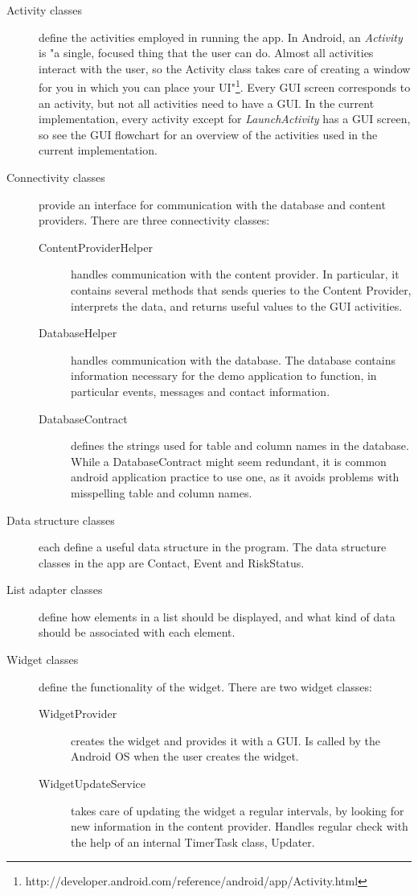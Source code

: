 \begin{description}

\item[Activity classes]
define the activities employed in running the app. In Android, an \emph{Activity} is "a single, focused thing that the user can do. Almost all activities interact with the user, so the Activity class takes care of creating a window for you in which you can place your UI"\footnote{http://developer.android.com/reference/android/app/Activity.html}. Every GUI screen corresponds to an activity, but not all activities need to have a GUI. In the current implementation, every activity except for \textit{LaunchActivity} has a GUI screen, so see the GUI flowchart for an overview of the activities used in the current implementation. 

\item[Connectivity classes]
provide an interface for communication with the database and content providers. There are three connectivity classes:
\begin{description}
\item[ContentProviderHelper] handles communication with the content provider. In particular, it contains several methods that sends queries to the Content Provider, interprets the data, and returns useful values to the GUI activities.
\item[DatabaseHelper] handles communication with the database. The database contains information necessary for the demo application to function, in particular events, messages and contact information.
\item[DatabaseContract] defines the strings used for table and column names in the database. While a DatabaseContract might seem redundant, it is common android application practice to use one, as it avoids problems with misspelling table and column names.
\end{description}

\item[Data structure classes]
each define a useful data structure in the program. The data structure classes in the app are Contact, Event and RiskStatus.

\item[List adapter classes]
define how elements in a list should be displayed, and what kind of data should be associated with each element.

\item[Widget classes]
define the functionality of the widget. There are two widget classes:
\begin{description}
\item[WidgetProvider] creates the widget and provides it with a GUI. Is called by the Android OS when the user creates the widget.
\item[WidgetUpdateService] takes care of updating the widget a regular intervals, by looking for new information in the content provider. Handles regular check with the help of an internal TimerTask class, Updater.
\end{description}
\end{description}
